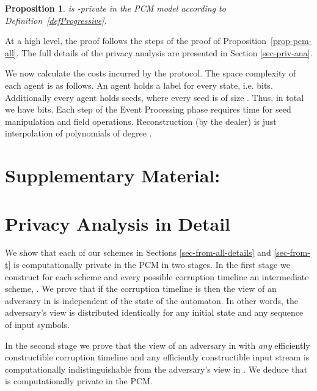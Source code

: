 \documentclass[letterpaper,11pt]{article}
\newcommand{\ignore}[1]{}
               {}
\newtheorem{proposition}[theorem]{Proposition}
\begin{document}
\begin{proposition}
\label{prop-pcm-tn}
 is -private in the PCM model according to Definition~\ref{defProgressive}.
\end{proposition}
\noindent At a high level, the proof follows the steps of the proof of 
Proposition~\ref{prop-pcm-all}. The full details of the privacy
analysis are presented in Section \ref{sec-priv-ana}.



We now calculate the costs incurred by the protocol.  The space
complexity of each agent is as follows. An agent holds a label for
every state, i.e. 
bits. Additionally every agent holds  seeds, where every seed is of size . Thus, in total we have 
bits. Each step of the Event Processing phase requires  time for seed manipulation and field
operations. Reconstruction (by the dealer)
is just interpolation of  polynomials of degree .

\newpage
\section*{Supplementary Material:}
\section{Privacy Analysis in Detail \label{sec-priv-ana}}

\ignore{
\todo{I started reading the proofs but got confused a little.  I modified and moved the definitions part to prelims.  I wrote my own proofs in previous sections.  I am not 100\% convinced by my proofs, so please adjust and/or check if they make sense. I think the rest of this section can go.

 Also, you guys pay a lot of attention to the PRG syntax (and other minute details).  Usually in crypto papers it is taken for granted, and people don't write it all out.}

} 
We show that each of our schemes in Sections
\ref{sec-from-all-details} and \ref{sec-from-t} is computationally
private in the PCM in two stages. In the first stage we construct for
each scheme  and every possible corruption timeline  an
intermediate scheme, . We prove that if the corruption
timeline is  then the view of an adversary in  is
independent of the state of the automaton. In other words, the
adversary's view is distributed identically for any initial state and
any sequence of input symbols.

In the second stage we prove that the view of an adversary in 
with {\em any} efficiently constructible corruption timeline 
and any efficiently constructible input stream is computationally
indistinguishable from the adversary's view in . We
deduce that  is computationally private in the PCM.
\end{document}
